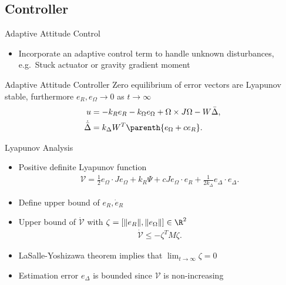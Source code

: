 \subsection*{Controller}

\begin{frame}{Adaptive Attitude Control} %
\begin{itemize}
    \item Incorporate an adaptive control term to handle unknown disturbances, e.g.\ Stuck actuator or gravity gradient moment
\end{itemize}
\pause
\vs
    \begin{block}{Adaptive Attitude Controller}
        Zero equilibrium of error vectors are Lyapunov stable, furthermore \( e_R , e_\Omega \to 0 \) as \( t \to \infty \)
        \begin{align*}
            u &= - k_R e_R - k_{\Omega} e_{\Omega} + \Omega \times J \Omega - W \bar{\Delta}, \\
            \dot{\bar{\Delta}} &= k_\Delta W^T \parenth{ e_\Omega + c e_R } .
        \end{align*}
    \end{block}
    
\end{frame}   %

\begin{frame}[label=proof]{Lyapunov Analysis}
\begin{itemize}
    \item Positive definite Lyapunov function
    \begin{align*}
        \mathcal{V} = \frac{1}{2} e_\Omega \cdot J e_\Omega + k_R \Psi + c J e_\Omega \cdot e_R + \frac{1}{2 k_\Delta} e_\Delta \cdot e_\Delta . \label{eqn:v_adapt}
    \end{align*}
    \pause
    \item Define upper bound of \( e_R, \dot{e}_{R}\)
    \item Upper bound of \( \dot{\mathcal{V}} \) with \(\zeta=[\|e_R\|,\|e_\Omega\|]\in\R^2\)
    \begin{align*}
        \dot{\mathcal{V}} \leq -\zeta^T M \zeta .
    \end{align*}
    \pause
    \item LaSalle-Yoshizawa theorem implies that \(\lim_{t\to\infty} \zeta=0\) 
    \item Estimation error \( e_\Delta \) is bounded since \( \mathcal{V} \) is non-increasing
\end{itemize}
\end{frame}


